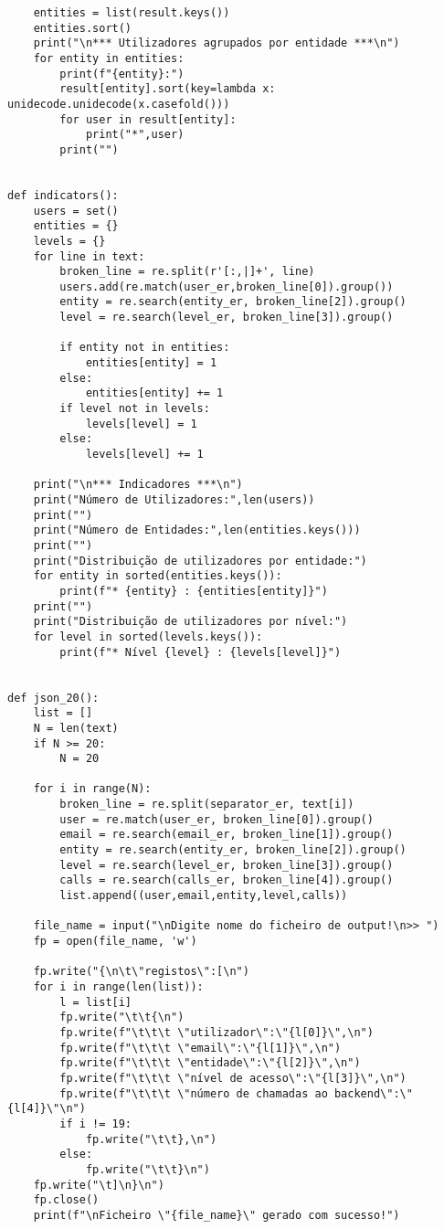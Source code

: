\documentclass[11pt,a4paper]{report}%
\begin{document}
\begin{verbatim}
    entities = list(result.keys())
    entities.sort()
    print("\n*** Utilizadores agrupados por entidade ***\n")
    for entity in entities:
        print(f"{entity}:")
        result[entity].sort(key=lambda x: unidecode.unidecode(x.casefold()))
        for user in result[entity]:
            print("*",user)
        print("")


def indicators():
    users = set()
    entities = {}
    levels = {}
    for line in text:
        broken_line = re.split(r'[:,|]+', line)
        users.add(re.match(user_er,broken_line[0]).group())
        entity = re.search(entity_er, broken_line[2]).group()
        level = re.search(level_er, broken_line[3]).group()

        if entity not in entities:
            entities[entity] = 1
        else:
            entities[entity] += 1
        if level not in levels:
            levels[level] = 1
        else:
            levels[level] += 1

    print("\n*** Indicadores ***\n")
    print("Número de Utilizadores:",len(users))
    print("")
    print("Número de Entidades:",len(entities.keys()))
    print("")
    print("Distribuição de utilizadores por entidade:")
    for entity in sorted(entities.keys()):
        print(f"* {entity} : {entities[entity]}")
    print("")
    print("Distribuição de utilizadores por nível:")
    for level in sorted(levels.keys()):
        print(f"* Nível {level} : {levels[level]}")


def json_20():
    list = []
    N = len(text)
    if N >= 20:
        N = 20

    for i in range(N):
        broken_line = re.split(separator_er, text[i])
        user = re.match(user_er, broken_line[0]).group()
        email = re.search(email_er, broken_line[1]).group()
        entity = re.search(entity_er, broken_line[2]).group()
        level = re.search(level_er, broken_line[3]).group()
        calls = re.search(calls_er, broken_line[4]).group()
        list.append((user,email,entity,level,calls))

    file_name = input("\nDigite nome do ficheiro de output!\n>> ")
    fp = open(file_name, 'w')

    fp.write("{\n\t\"registos\":[\n")
    for i in range(len(list)):
        l = list[i]
        fp.write("\t\t{\n")
        fp.write(f"\t\t\t \"utilizador\":\"{l[0]}\",\n")
        fp.write(f"\t\t\t \"email\":\"{l[1]}\",\n")
        fp.write(f"\t\t\t \"entidade\":\"{l[2]}\",\n")
        fp.write(f"\t\t\t \"nível de acesso\":\"{l[3]}\",\n")
        fp.write(f"\t\t\t \"número de chamadas ao backend\":\"{l[4]}\"\n")
        if i != 19:
            fp.write("\t\t},\n")
        else:
            fp.write("\t\t}\n")
    fp.write("\t]\n}\n")
    fp.close()
    print(f"\nFicheiro \"{file_name}\" gerado com sucesso!")



\end{verbatim}
\end{document}
